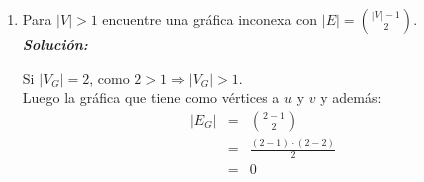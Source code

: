 \documentclass{article}
\begin{document}
\begin{enumerate}
\begin{enumerate}
\begin{proof}
\begin{itemize}
          \item[-] Si $G$ no es conexa, entonces existe un vértice aislado $x$, ya que:
            \begin{eqnarray*}
              {|V| -1 \choose 2} &=& \frac{|V_G|^2 -|V_G| -2 \cdot |V| +2}{2}\\
              &=& \frac{|V_G|^2 -|V_G|}{2} + \frac{2 -2|V_G|}{2}\\
              &=& \frac{|V_G| \cdot (|V_G| -1)}{2} - \frac{\cancel{2} \cdot (|V_G| -1)}{\cancel{2}}\\
              &=& {|V_G| \choose 2} - (|V_G| -1)
            \end{eqnarray*}
            Sabemos por resultados vistos en clases que hay ${|V_G| \choose 2}$ aristas en
            una gráfica completa y un vértice puede relacionarse a lo más con $|V_G| -1$ vértices
            (pues estamos trabajando con gráficas simples). \\
            Nótese que de lo anterior se infiere que $G - x$ es conexa
            \footnote{Esto ya que $|E_{G -x}| = {|V_G| \choose 2}$.}
            y así $G + e$ (con $e \in E_G$)
            \begin{eqnarray*}
              |E_{G +e}| &=& {|V| -1 \choose 2} +1\\
              &>& {|V| -1 \choose 2}
            \end{eqnarray*}
            es conexa, pues no hay lazos y no hay aristas múltiples en $G$. \\
            Entonces, tenemos que la nueva arista está comprendida entre $x$ y algún otro
            vértice en $V_{G -x}$. Por lo que habrá una $xy$-trayectoria para $y \in E_G$.
        \end{itemize}
        De lo anterior, concluimos que
        $|E_G| > {|V| -1 \choose 2} \Rightarrow G \text{ es conexa.}$ \\
      \end{proof}

    \item Para $|V| > 1$ encuentre una gr\'afica inconexa con $|E| = {|V|-1
      \choose 2}$. \\

      \textbf{\textit{Solución:}}

      Si $|V_G| = 2$, como $2 > 1 \Rightarrow |V_G| > 1$. \\
      Luego la gráfica que tiene como vértices a $u$ y $v$ y además:
      \begin{eqnarray*}
        |E_G| &=& {2 -1 \choose 2}\\
        &=& \frac{(2 -1) \cdot (2 -2)}{2}\\
        &=& 0
      \end{eqnarray*}


\end{enumerate}
\end{enumerate}
\end{document}
